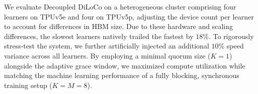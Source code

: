 \documentclass[11pt, a4paper, twocolumn, copyright, google]{google}
\begin{document}
\begin{table}[!b]
\centering
\small 
\setlength{\tabcolsep}{6pt} %
\caption{\textbf{Heterogeneous hardware} ML performance of a 2B dense model with 26B tokens using Decoupled DiLoCo ($M=8$) with a mix of TPUv6e and TPUv5p.}
\label{tab:tab_heterogeneous_hw}
\end{table}


We evaluate Decoupled DiLoCo on a heterogeneous cluster comprising four learners on TPUv5e and four on TPUv5p, adjusting the device count per learner to account for differences in HBM size. Due to these hardware and scaling differences, the slowest learners natively trailed the fastest by $18\%$. To rigorously stress-test the system, we further artificially injected an additional $10\%$ speed variance across all learners. By employing a minimal quorum size ($K=1$) alongside the adaptive grace window, we maximized compute utilization while matching the machine learning performance of a fully blocking, synchronous training setup ($K=M=8$).
\end{document}
